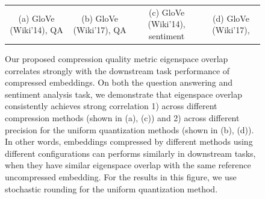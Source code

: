 \begin{figure}
\begin{tabular}{@{\hskip -0.0in}c@{\hskip -0.0in}c@{\hskip -0.0in}c@{\hskip -0.0in}c@{\hskip -0.0in}}
		(a) GloVe (Wiki'14), QA & \;\;\;\;(b) GloVe (Wiki'17), QA  & \;\;\;\;\;\;(c) GloVe (Wiki'14), sentiment & \;\;\;\;\;(d) GloVe (Wiki'17), 
	\end{tabular}
	\caption{Our proposed compression quality metric eigenspace overlap correlates strongly with the downstream task performance of compressed embeddings.  On both the question answering and sentiment analysis task, we demonstrate that eigenspace overlap consistently achieves strong correlation 1) across different compression methods (shown in (a), (c)) and 2) across different precision for the uniform quantization methods (shown in (b), (d)). In other words, embeddings compressed by different methods using different configurations can performs similarly in downstream tasks, when they have similar eigenspace overlap with the same reference uncompressed embedding. For the results in this figure, we use stochastic rounding for the uniform quantization method.}
	\label{fig:good_correlation_det}
\end{figure}


